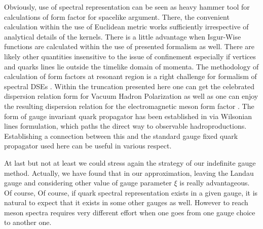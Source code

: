 \documentclass[aps,prd,superscriptaddress,eqsecnum,amsfonts,showpacs,epsfig]{revtex4}
\begin{document}
 Obviously, use of spectral representation can be seen as heavy hammer tool  for calculations of form factor for spacelike argument.
 There, the convenient calculation within the use of Euclidean metric works sufficiently irrespective of analytical details of the kernels.  There is a little advantage   when Isgur-Wise functions \cite{IW1989,IW1990} are calculated within the use of presented formalism as well. There are likely other quantities  insensitive to the issue of confinement especially if vertices and  quarks lines lie outside the timelike domain of momenta. 
 The methodology of calculation of form factors at resonant region is a right challenge for formalism of spectral DSEs . Within the truncation presented here one can get the celebrated dispersion relation form \cite{CAGA1961} for Vacuum Hadron Polarization as well as one can enjoy the resulting  dispersion relation for  the electromagnetic meson form factor \cite{s3}.  The form of  gauge invariant  quark propagator has been established  in \cite{ACS2023} via Wilsonian lines formulation, which paths the direct way to observable hadroproductions.  Establishing a connection between this and the standard gauge fixed  quark propagator used here  can be useful in various respect.   
 

At last but  not at least we could stress again the  strategy of our indefinite gauge method. Actually, we have found that in our approximation, leaving the Landau gauge  and considering other value of gauge parameter $\xi$ is really advantageous. Of course,
Of course, if  quark spectral representation exists in a given gauge, 
it is natural to expect that  it exists in some other gauges as well. However to reach  meson spectra  requires very different effort when one goes from one gauge choice to another one. 
 
\end{document}
